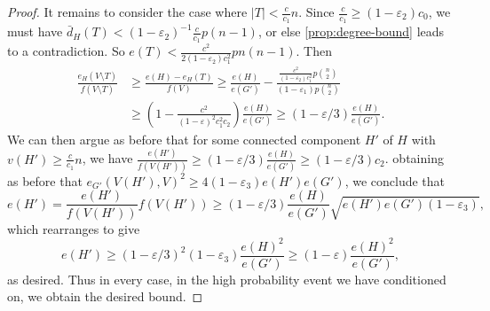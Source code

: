 \documentclass[10pt,a4paper]{amsart}
\begin{document}
\begin{proof}
    It remains to consider the case where $|T|<\frac{c}{c_1}n$. Since $\frac{c}{c_1}\ge (1-\varepsilon_2)c_0$, we must have $\bar d_{H}(T)<(1-\varepsilon_2)^{-1} \frac{c}{c_1}p(n-1)$, or else \cref{prop:degree-bound} leads to a contradiction. So $e(T)<\frac{c^2}{2(1-\varepsilon_2)c_1^2}pn(n-1)$. Then
    \begin{align*}
        \frac{e_{H}(V\setminus T)}{f(V\setminus T)}&\ge \frac{e(H)-e_{H}(T)}{f(V)}\ge \frac{e(H)}{e(G')}-\frac{\frac{c^2}{(1-\varepsilon_2)c_1^2}p\binom{n}{2}}{(1-\varepsilon_1)p\binom{n}{2}}\\
        &\ge \left(1-\frac{c^2}{(1-\varepsilon)^2c_1^2c_2}\right)\frac{e(H)}{e(G')} \ge (1-\varepsilon/3)\frac{e(H)}{e(G')}.
    \end{align*}
    We can then argue as before that for some connected component $H'$ of $H$ with $v(H')\ge \frac{c}{c_1}n$, we have $\frac{e(H')}{f(V(H'))}\ge (1-\varepsilon/3)\frac{e(H)}{e(G')}\ge (1-\varepsilon/3)c_2$. obtaining as before that $e_{G'}(V(H'),V)^2\ge 4(1-\varepsilon_3)e(H')e(G')$, we conclude that
    \[
        e(H')=\frac{e(H')}{f(V(H'))} f(V(H')) \ge(1-\varepsilon/3) \frac{e(H)}{e(G')}\sqrt{e(H')e(G')(1-\varepsilon_3)},
    \]
    which rearranges to give
    \[
        e(H')\ge (1-\varepsilon/3)^2(1-\varepsilon_3)\frac{e(H)^2}{e(G')}\ge (1-\varepsilon)\frac{e(H)^2}{e(G')},
    \]
    as desired. 
    Thus in every case, in the high probability event we have conditioned on, we obtain the desired bound.
\end{proof}
\end{document}
